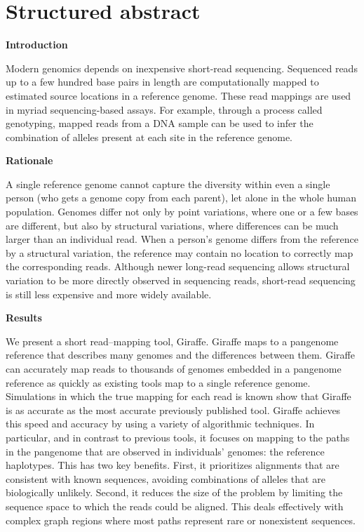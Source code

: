 \documentclass[11pt]{ucscthesis}
\begin{document}
\section{Structured abstract}

\noindent
\textbf{Introduction}

Modern genomics depends on inexpensive short-read sequencing.
Sequenced reads up to a few hundred base pairs in length are computationally mapped to estimated source locations in a reference genome.
These read mappings are used in myriad sequencing-based assays.
For example, through a process called genotyping, mapped reads from a DNA sample can be used to infer the combination of alleles present at each site in the reference genome.

\noindent
\textbf{Rationale}

A single reference genome cannot capture the diversity within even a single person (who gets a genome copy from each parent), let alone in the whole human population.
Genomes differ not only by point variations, where one or a few bases are different, but also by structural variations, where differences can be much larger than an individual read.
When a person’s genome differs from the reference by a structural variation, the reference may contain no location to correctly map the corresponding reads.
Although newer long-read sequencing allows structural variation to be more directly observed in sequencing reads, short-read sequencing is still less expensive and more widely available.

\noindent
\textbf{Results}

We present a short read–mapping tool, Giraffe.
Giraffe maps to a pangenome reference that describes many genomes and the differences between them.
Giraffe can accurately map reads to thousands of genomes embedded in a pangenome reference as quickly as existing tools map to a single reference genome.
Simulations in which the true mapping for each read is known show that Giraffe is as accurate as the most accurate previously published tool.
Giraffe achieves this speed and accuracy by using a variety of algorithmic techniques.
In particular, and in contrast to previous tools, it focuses on mapping to the paths in the pangenome that are observed in individuals’ genomes: the reference haplotypes.
This has two key benefits.
First, it prioritizes alignments that are consistent with known sequences, avoiding combinations of alleles that are biologically unlikely.
Second, it reduces the size of the problem by limiting the sequence space to which the reads could be aligned.
This deals effectively with complex graph regions where most paths represent rare or nonexistent sequences.
\end{document}
